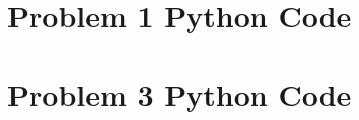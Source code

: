 \documentclass[main]{subfiles}
\begin{document}
	\begin{appendices}
		\section{Problem 1 Python Code}
		\label{Problem1Python}
		\newpage

		\section{Problem 3 Python Code}
		\label{Problem3Python}

		\newpage
	\end{appendices}
\end{document}
